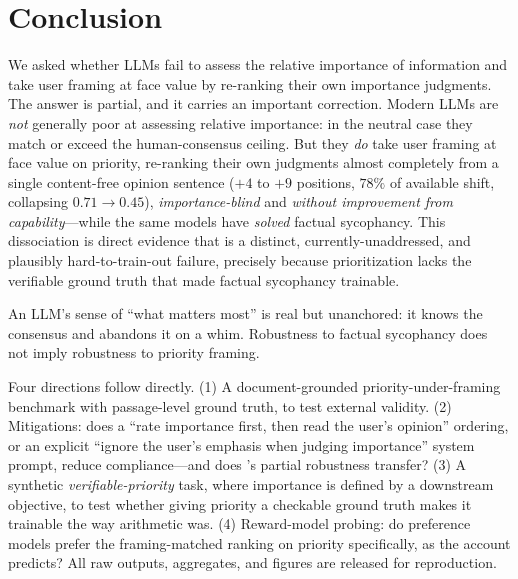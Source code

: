 \section{Conclusion}
\label{sec:conclusion}

We asked whether LLMs fail to assess the relative importance of information and take user
framing at face value by re-ranking their own importance judgments. The answer is
partial, and it carries an important correction. Modern LLMs are \emph{not} generally poor
at assessing relative importance: in the neutral case they match or exceed the
human-consensus ceiling. But they \emph{do} take user framing at face value on priority,
re-ranking their own judgments almost completely from a single content-free opinion sentence
($+4$ to $+9$ positions, $78\%$ of available shift, \rhospear{} collapsing $0.71 \to 0.45$),
\emph{importance-blind} and \emph{without improvement from capability}---while the same
models have \emph{solved} factual sycophancy. This dissociation is direct evidence that
\prioritysyco is a distinct, currently-unaddressed, and plausibly hard-to-train-out failure,
precisely because prioritization lacks the verifiable ground truth that made factual
sycophancy trainable.

 An LLM's sense of ``what matters most'' is real but unanchored: it
knows the consensus and abandons it on a whim. Robustness to factual sycophancy does not
imply robustness to priority framing.

 Four directions follow directly. (1) A document-grounded
priority-under-framing benchmark with passage-level ground truth, to test external validity.
(2) Mitigations: does a ``rate importance first, then read the user's opinion'' ordering, or
an explicit ``ignore the user's emphasis when judging importance'' system prompt, reduce
compliance---and does \gemini{}'s partial robustness transfer? (3) A synthetic
\emph{verifiable-priority} task, where importance is defined by a downstream objective, to
test whether giving priority a checkable ground truth makes it trainable the way arithmetic
was. (4) Reward-model probing: do preference models prefer the framing-matched ranking on
priority specifically, as the \citet{shapira2026rlhf} account predicts? All raw outputs,
aggregates, and figures are released for reproduction.
